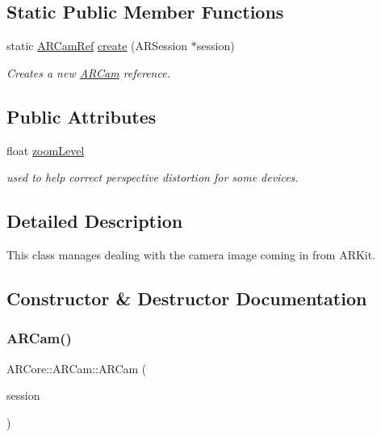 \subsection*{Static Public Member Functions}
\begin{DoxyCompactItemize}
\item 
static \hyperlink{namespace_a_r_core_a4ebe9e23907235fcf76bf65440fde0e0}{A\+R\+Cam\+Ref} \hyperlink{class_a_r_core_1_1_a_r_cam_ad4a6c0ebf786ea4e745cc8e95790681a}{create} (A\+R\+Session $\ast$session)
\begin{DoxyCompactList}\small\item\em Creates a new \hyperlink{class_a_r_core_1_1_a_r_cam}{A\+R\+Cam} reference. \end{DoxyCompactList}\end{DoxyCompactItemize}
\subsection*{Public Attributes}
\begin{DoxyCompactItemize}
\item 
float \hyperlink{class_a_r_core_1_1_a_r_cam_ac17d3b7fd12f51b2c54b7241efd36cd4}{zoom\+Level}
\begin{DoxyCompactList}\small\item\em used to help correct perspective distortion for some devices. \end{DoxyCompactList}\end{DoxyCompactItemize}


\subsection{Detailed Description}
This class manages dealing with the camera image coming in from A\+R\+Kit. 

\subsection{Constructor \& Destructor Documentation}
\mbox{\label{class_a_r_core_1_1_a_r_cam_aac3da0758960b1cc5787eae0b7efffe1}} 
\subsubsection{\texorpdfstring{A\+R\+Cam()}{ARCam()}}
{\footnotesize\ttfamily A\+R\+Core\+::\+A\+R\+Cam\+::\+A\+R\+Cam (\begin{DoxyParamCaption}\item[{A\+R\+Session $\ast$}]{session }\end{DoxyParamCaption})}



